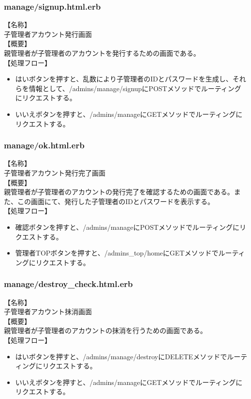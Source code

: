 \documentclass[a4j]{jarticle}
\begin{document}
\subsubsection{manage/signup.html.erb}
\noindent
【名称】\\
子管理者アカウント発行画面\\
【概要】\\
親管理者が子管理者のアカウントを発行するための画面である。\\
【処理フロー】
\begin{itemize}
  \item はいボタンを押すと、乱数により子管理者のIDとパスワードを生成し、それらを情報として、/admins/manage/signupにPOSTメソッドでルーティングにリクエストする。
  \item いいえボタンを押すと、/admins/manageにGETメソッドでルーティングにリクエストする。
\end{itemize}

\subsubsection{manage/ok.html.erb}
\noindent
【名称】\\
子管理者アカウント発行完了画面\\
【概要】\\
親管理者が子管理者のアカウントの発行完了を確認するための画面である。また、この画面にて、発行した子管理者のIDとパスワードを表示する。\\
【処理フロー】
\begin{itemize}
  \item 確認ボタンを押すと、/admins/manageにPOSTメソッドでルーティングにリクエストする。
  \item 管理者TOPボタンを押すと、/admins\_top/homeにGETメソッドでルーティングにリクエストする。
\end{itemize}

\subsubsection{manage/destroy\_check.html.erb}
\noindent
【名称】\\
子管理者アカウント抹消画面\\
【概要】\\
親管理者が子管理者のアカウントの抹消を行うための画面である。\\
【処理フロー】
\begin{itemize}
  \item はいボタンを押すと、/admins/manage/destroyにDELETEメソッドでルーティングにリクエストする。
  \item いいえボタンを押すと、/admins/manageにGETメソッドでルーティングにリクエストする。
\end{itemize}
\end{document}
